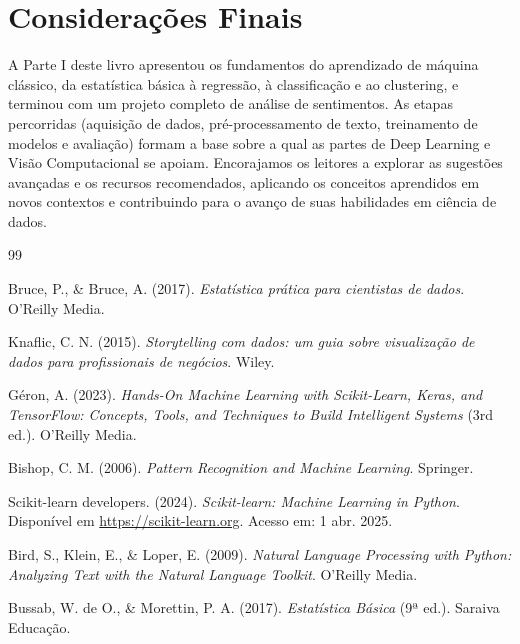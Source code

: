 \documentclass[a4paper,12pt,openany]{book}
\begin{document}
\section{Considerações Finais}
A Parte I deste livro apresentou os fundamentos do aprendizado de máquina clássico, da estatística básica à regressão, à classificação e ao clustering, e terminou com um projeto completo de análise de sentimentos. As etapas percorridas (aquisição de dados, pré-processamento de texto, treinamento de modelos e avaliação) formam a base sobre a qual as partes de Deep Learning e Visão Computacional se apoiam. Encorajamos os leitores a explorar as sugestões avançadas e os recursos recomendados, aplicando os conceitos aprendidos em novos contextos e contribuindo para o avanço de suas habilidades em ciência de dados.

\begin{thebibliography}{99}

Bruce, P., \& Bruce, A. (2017). \textit{Estatística prática para cientistas de dados}. O'Reilly Media.

Knaflic, C. N. (2015). \textit{Storytelling com dados: um guia sobre visualização de dados para profissionais de negócios}. Wiley.

Géron, A. (2023). \textit{Hands-On Machine Learning with Scikit-Learn, Keras, and TensorFlow: Concepts, Tools, and Techniques to Build Intelligent Systems} (3rd ed.). O'Reilly Media.

Bishop, C. M. (2006). \textit{Pattern Recognition and Machine Learning}. Springer.

Scikit-learn developers. (2024). \textit{Scikit-learn: Machine Learning in Python}. Disponível em \url{https://scikit-learn.org}. Acesso em: 1 abr. 2025.

Bird, S., Klein, E., \& Loper, E. (2009). \textit{Natural Language Processing with Python: Analyzing Text with the Natural Language Toolkit}. O'Reilly Media.

Bussab, W. de O., \& Morettin, P. A. (2017). \textit{Estatística Básica} (9ª ed.). Saraiva Educação.

\end{thebibliography}
\end{document}

